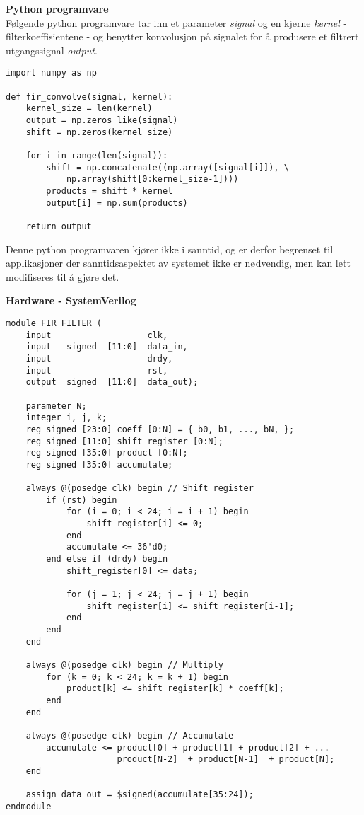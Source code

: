 \textbf{Python programvare}\\
Følgende python programvare tar inn et parameter \textit{signal} og en kjerne \textit{kernel} - filterkoeffisientene - og benytter 
konvolusjon på signalet for å produsere et filtrert utgangssignal \textit{output}. 

\begin{tcolorbox}[colback=white, colframe=white!55!black]
\begin{verbatim}
import numpy as np

def fir_convolve(signal, kernel):
    kernel_size = len(kernel)
    output = np.zeros_like(signal)
    shift = np.zeros(kernel_size) 

    for i in range(len(signal)):
        shift = np.concatenate((np.array([signal[i]]), \
            np.array(shift[0:kernel_size-1])))
        products = shift * kernel
        output[i] = np.sum(products)
    
    return output
\end{verbatim}
\end{tcolorbox}

Denne python programvaren kjører ikke i sanntid, og er derfor begrenset til applikasjoner der sanntidsaspektet av 
systemet ikke er nødvendig, men kan lett modifiseres til å gjøre det. 

\textbf{Hardware - SystemVerilog}\\
\begin{tcolorbox}[colback=white, colframe=white!55!black]
\begin{verbatim}
module FIR_FILTER (
    input                   clk,
    input   signed  [11:0]  data_in,
    input                   drdy,
    input                   rst,
    output  signed  [11:0]  data_out);

    parameter N;
    integer i, j, k;
    reg signed [23:0] coeff [0:N] = { b0, b1, ..., bN, };
    reg signed [11:0] shift_register [0:N];
    reg signed [35:0] product [0:N];
    reg signed [35:0] accumulate;

    always @(posedge clk) begin // Shift register
        if (rst) begin
            for (i = 0; i < 24; i = i + 1) begin
                shift_register[i] <= 0;
            end
            accumulate <= 36'd0;
        end else if (drdy) begin
            shift_register[0] <= data;

            for (j = 1; j < 24; j = j + 1) begin
                shift_register[i] <= shift_register[i-1];
            end
        end
    end

    always @(posedge clk) begin // Multiply
        for (k = 0; k < 24; k = k + 1) begin
            product[k] <= shift_register[k] * coeff[k];
        end
    end

    always @(posedge clk) begin // Accumulate
        accumulate <= product[0] + product[1] + product[2] + ...
                      product[N-2]  + product[N-1]  + product[N];
    end

    assign data_out = $signed(accumulate[35:24]);
endmodule
\end{verbatim}
\end{tcolorbox}

